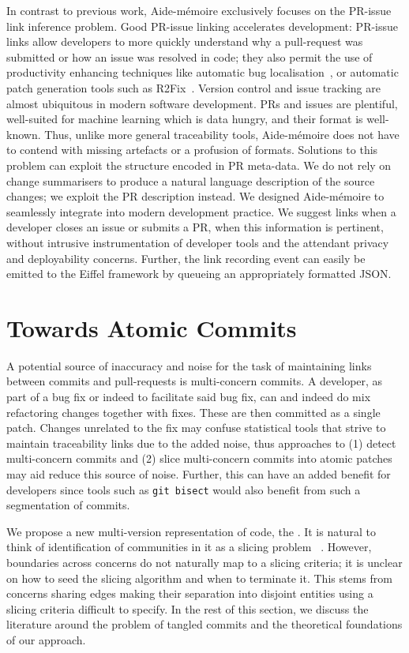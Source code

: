 In contrast to previous work, Aide-mémoire exclusively focuses on the PR-issue
link inference problem. Good PR-issue linking accelerates development: PR-issue
links allow developers to more quickly understand why a pull-request was
submitted or how an issue was resolved in code; they also permit the use of
productivity enhancing techniques like automatic bug
localisation~\cite{BugLocBasedOnHistory, SoftChangeToBugLoc}, or automatic patch
generation tools such as R2Fix~\cite{R2Fix}. Version control and issue tracking
are almost ubiquitous in modern software development. PRs and issues are
plentiful, well-suited for machine learning which is data hungry, and their
format is well-known. Thus, unlike more general traceability tools, Aide-mémoire
does not have to contend with missing artefacts or a profusion of formats.
Solutions to this problem can exploit the structure encoded in PR meta-data. We
do not rely on change summarisers to produce a natural language description of
the source changes; we exploit the PR description instead. We designed
Aide-mémoire to seamlessly integrate into modern development practice. We
suggest links when a developer closes an issue or submits a PR, when this
information is pertinent, without intrusive instrumentation of developer tools
and the attendant privacy and deployability concerns. Further, the link
recording event can easily be emitted to the Eiffel framework by queueing an
appropriately formatted JSON.

\section{Towards Atomic Commits}
\label{chapter:literature:sec:flexeme_rel_work}

A potential source of inaccuracy and noise for the task of maintaining links
between commits and pull-requests is multi-concern commits. A developer, as part
of a bug fix or indeed to facilitate said bug fix, can and indeed do mix
refactoring changes together with fixes. These are then committed as a single
patch. Changes unrelated to the fix may confuse statistical tools that strive to
maintain traceability links due to the added noise, thus approaches to (1)
detect multi-concern commits and (2) slice multi-concern commits into atomic
patches may aid reduce this source of noise. Further, this can have an added
benefit for developers since tools such as \lstinline+git bisect+ would also
benefit from such a segmentation of commits.

We propose a new multi-version representation of code, the \deltaPDGN. It is
natural to think of identification of communities in it as a slicing problem
~\cite{slicingsurvey}. However, boundaries across concerns do not naturally map
to a slicing criteria; it is unclear on how to seed the slicing algorithm and
when to terminate it. This stems from concerns sharing edges making their
separation into disjoint entities using a slicing criteria difficult to specify.
In the rest of this section, we discuss the literature around the problem of
tangled commits and the theoretical foundations of our approach.

